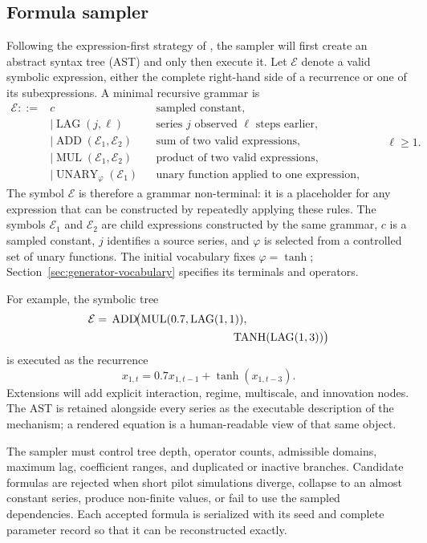 \subsection{Formula sampler}

Following the expression-first strategy of \citet{dascoli2022deep}, the
sampler will first create an abstract syntax tree (AST) and only then execute
it. Let $\mathcal E$ denote a valid symbolic expression, either the complete
right-hand side of a recurrence or one of its subexpressions. A minimal
recursive grammar is
\[
\begin{aligned}
\mathcal E ::= {}& c
&& \text{sampled constant,}\\
&\mid \operatorname{LAG}(j,\ell)
&& \text{series $j$ observed $\ell$ steps earlier,}\\
&\mid \operatorname{ADD}(\mathcal E_1,\mathcal E_2)
&& \text{sum of two valid expressions,}\\
&\mid \operatorname{MUL}(\mathcal E_1,\mathcal E_2)
&& \text{product of two valid expressions,}\\
&\mid \operatorname{UNARY}_{\varphi}(\mathcal E_1)
&& \text{unary function applied to one expression,}
\end{aligned}
\qquad \ell\geq 1.
\]
The symbol $\mathcal E$ is therefore a grammar non-terminal: it is a
placeholder for any expression that can be constructed by repeatedly applying
these rules. The symbols $\mathcal E_1$ and $\mathcal E_2$ are child
expressions constructed by the same grammar, $c$ is a sampled constant, $j$
identifies a source series, and $\varphi$ is selected from a controlled set of
unary functions. The initial vocabulary fixes $\varphi=\tanh$;
Section~\ref{sec:generator-vocabulary} specifies its terminals and operators.

For example, the symbolic tree
\[
\begin{aligned}
\mathcal E={}&\operatorname{ADD}\!\bigl(
    \operatorname{MUL}(0.7,\operatorname{LAG}(1,1)),\\
&\hspace{38mm}\operatorname{TANH}(\operatorname{LAG}(1,3))
\bigr)
\end{aligned}
\]
is executed as the recurrence
\[
x_{1,t}=0.7x_{1,t-1}+\tanh(x_{1,t-3}).
\]
Extensions will add explicit interaction, regime, multiscale, and innovation
nodes. The AST is retained alongside every series as the executable description
of the mechanism; a rendered equation is a human-readable view of that same
object.

The sampler must control tree depth, operator counts, admissible domains,
maximum lag, coefficient ranges, and duplicated or inactive branches. Candidate
formulas are rejected when short pilot simulations diverge, collapse to an
almost constant series, produce non-finite values, or fail to use the sampled
dependencies. Each accepted formula is serialized with its seed and complete
parameter record so that it can be reconstructed exactly.

